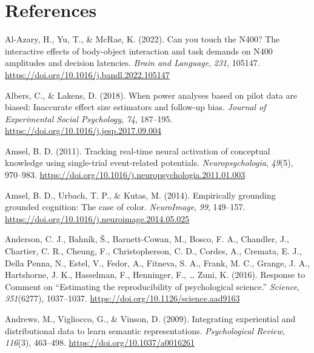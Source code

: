 \documentclass[
  12pt,
  man,floatsintext]{apa7}
\newlength{\cslhangindent}
\newlength{\cslentryspacingunit} %
\newenvironment{CSLReferences}[2] %
 {%
  \setlength{\parindent}{0pt}
  \ifodd #1
  \let\oldpar\par
  \def\par{\hangindent=\cslhangindent\oldpar}
  \fi
  \setlength{\parskip}{#2\cslentryspacingunit}
 }%
 {}
\begin{document}
\clearpage

\hypertarget{references}{%
\section{References}\label{references}}

\hypertarget{refs}{}
\begin{CSLReferences}{1}{0}
\leavevmode{}%
Al-Azary, H., Yu, T., \& McRae, K. (2022). Can you touch the {N400}? {The} interactive effects of body-object interaction and task demands on {N400} amplitudes and decision latencies. \emph{Brain and Language}, \emph{231}, 105147. \url{https://doi.org/10.1016/j.bandl.2022.105147}

\leavevmode{}%
Albers, C., \& Lakens, D. (2018). When power analyses based on pilot data are biased: {Inaccurate} effect size estimators and follow-up bias. \emph{Journal of Experimental Social Psychology}, \emph{74}, 187--195. \url{https://doi.org/10.1016/j.jesp.2017.09.004}

\leavevmode{}%
Amsel, B. D. (2011). Tracking real-time neural activation of conceptual knowledge using single-trial event-related potentials. \emph{Neuropsychologia}, \emph{49}(5), 970--983. \url{https://doi.org/10.1016/j.neuropsychologia.2011.01.003}

\leavevmode{}%
Amsel, B. D., Urbach, T. P., \& Kutas, M. (2014). Empirically grounding grounded cognition: {The} case of color. \emph{NeuroImage}, \emph{99}, 149--157. \url{https://doi.org/10.1016/j.neuroimage.2014.05.025}

\leavevmode{}%
Anderson, C. J., Bahník, Š., Barnett-Cowan, M., Bosco, F. A., Chandler, J., Chartier, C. R., Cheung, F., Christopherson, C. D., Cordes, A., Cremata, E. J., Della Penna, N., Estel, V., Fedor, A., Fitneva, S. A., Frank, M. C., Grange, J. A., Hartshorne, J. K., Hasselman, F., Henninger, F., \ldots{} Zuni, K. (2016). Response to {Comment} on {``{Estimating} the reproducibility of psychological science.''} \emph{Science}, \emph{351}(6277), 1037--1037. \url{https://doi.org/10.1126/science.aad9163}

\leavevmode{}%
Andrews, M., Vigliocco, G., \& Vinson, D. (2009). Integrating experiential and distributional data to learn semantic representations. \emph{Psychological Review}, \emph{116}(3), 463--498. \url{https://doi.org/10.1037/a0016261}


\end{CSLReferences}
\end{document}
